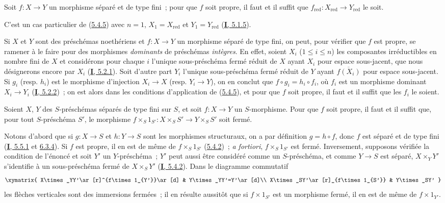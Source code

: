 \begin{corollary}[5.4.6]
\label{II.5.4.6-fr}
Soit $f:X\to Y$ un morphisme séparé et de type fini~; pour que $f$ soit
propre, il faut et il suffit que
$f_{\mathrm{red}}:X_{\mathrm{red}}\to Y_{\mathrm{red}}$ le soit.
\end{corollary}

C'est un cas particulier de (\hyperref[II.5.4.5-fr]{5.4.5}) avec $n=1$,
$X_1=X_{\mathrm{red}}$ et $Y_1=Y_{\mathrm{red}}$
(\hyperref[I.5.1.5-fr]{\textbf{I}, 5.1.5}).

\begin{env}[5.4.7]
\label{II.5.4.7-fr}
Si $X$ et $Y$ sont des préschémas noethériens et $f:X\to Y$ un morphisme
séparé de type fini, on peut, pour vérifier que $f$ est propre, se ramener à
le faire pour des morphismes \emph{dominants} de préschémas \emph{intègres}. En effet,
soient $X_i$ ($1\leq i\leq n$) les composantes irréductibles en nombre fini
de $X$ et considérons pour chaque $i$ l'unique sous-préschéma fermé réduit de
$X$ ayant $X_i$ pour espace sous-jacent, que nous désignerons encore par
$X_i$ (\hyperref[I.5.2.1-fr]{\textbf{I}, 5.2.1}). Soit d'autre part $Y_i$ l'unique
sous-préschéma fermé réduit de $Y$ ayant $\overline{f(X_i)}$ pour espace
sous-jacent. Si $g_i$ (resp. $h_i$) est le morphisme d'injection $X_i\to X$
(resp. $Y_i\to Y$), on en conclut que $f\circ g_i=h_i\circ f_i$, où $f_i$
est un morphisme dominant $X_i\to Y_i$
(\hyperref[I.5.2.2-fr]{\textbf{I}, 5.2.2})~; on est alors dans les conditions
d'application de (\hyperref[II.5.4.5-fr]{5.4.5}), et pour que $f$ soit
propre, il faut et il suffit que les $f_i$ le soient.
\end{env}

\begin{corollary}[5.4.8]
\label{II.5.4.8-fr}
Soient $X$, $Y$ des $S$-préschémas séparés de type fini sur $S$, et soit
$f:X\to Y$ un $S$-morphisme. Pour que $f$ soit propre, il faut et il suffit
que, pour tout $S$-préschéma $S'$, le morphisme
$f\times_S1_{S'}:X\times_SS'\to Y\times_SS'$ soit fermé.
\end{corollary}

Notons d'abord que si $g:X\to S$ et $h:Y\to S$ sont les morphismes
structuraux, on a par définition $g=h\circ f$, donc $f$ est séparé et de
type fini (\hyperref[I.5.5.1-fr]{\textbf{I}, 5.5.1} et
\hyperref[I.6.3.4-fr]{6.3.4}). Si $f$ est propre, il en est de même de
$f\times_S1_{S'}$ (\hyperref[II.5.4.2-fr]{5.4.2})~; \emph{a fortiori},
$f\times_S1_{S'}$ est fermé. Inversement, supposons vérifiée la condition de
l'énoncé et soit $Y'$ un $Y$-préschéma~; $Y'$ peut aussi être considéré
comme un $S$-préschéma, et comme $Y\to S$ est séparé, $X\times_YY'$
s'identifie à un sous-préschéma fermé de $X\times_SY'$
(\hyperref[I.5.4.2-fr]{\textbf{I}, 5.4.2}). Dans le diagramme commutatif
\[
  \xymatrix{
    X\times_YY'\ar[r]^{f\times1_{Y'}}\ar[d] &
    Y\times_YY'=Y'\ar[d]\\
    X\times_SY'\ar[r]_{f\times1_{S'}} & Y\times_SY'
  }
\]
les flèches verticales sont des immersions fermées~; il en résulte aussitôt
que si $f\times1_{S'}$ est un morphisme fermé, il en est de même de
$f\times1_{Y'}$.

